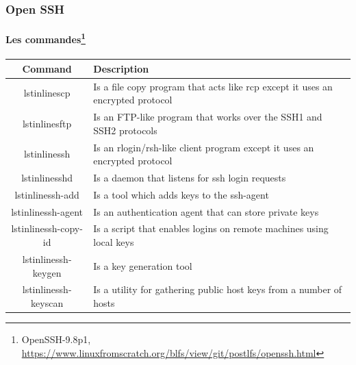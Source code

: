 \documentclass{beamer}
\begin{document}
    \begin{frame}
        \transdissolve
        \frametitle{Open SSH}
        \framesubtitle{Les commandes\footnote{OpenSSH-9.8p1, \url{https://www.linuxfromscratch.org/blfs/view/git/postlfs/openssh.html}}}
        \begin{footnotesize}
            \begin{table}[h!]
                \centering
                \begin{tabular}{|c|p{8cm}|}
                    \hline
                    \textbf{Command}       & \textbf{Description}                                                           \\
                    \hline
                    lstinline{scp}         & Is a file copy program that acts like rcp except it uses an encrypted protocol \\
                    \hline
                    lstinline{sftp}        & Is an FTP-like program that works over the SSH1 and SSH2 protocols             \\
                    \hline
                    lstinline{ssh}         & Is an rlogin/rsh-like client program except it uses an encrypted protocol      \\
                    \hline
                    lstinline{sshd}        & Is a daemon that listens for ssh login requests                                \\
                    \hline
                    lstinline{ssh-add}     & Is a tool which adds keys to the ssh-agent                                     \\
                    \hline
                    lstinline{ssh-agent}   & Is an authentication agent that can store private keys                         \\
                    \hline
                    lstinline{ssh-copy-id} & Is a script that enables logins on remote machines using local keys            \\
                    \hline
                    lstinline{ssh-keygen}  & Is a key generation tool                                                       \\
                    \hline
                    lstinline{ssh-keyscan} & Is a utility for gathering public host keys from a number of hosts             \\
                    \hline
                \end{tabular}
            \end{table}
        \end{footnotesize}
    \end{frame}
\end{document}
